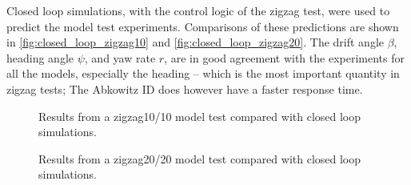 Closed loop simulations, with the control logic of the zigzag test, were used to predict the model test experiments. Comparisons of these predictions are shown in \autoref{fig:closed_loop_zigzag10} and \autoref{fig:closed_loop_zigzag20}. The drift angle $\beta$, heading angle $\psi$, and yaw rate $r$, are in good agreement with the experiments for all the models, especially the heading -- which is the most important quantity in zigzag tests; The Abkowitz ID does however have a faster response time.
\begin{figure}[h]
    \centering
    
    \caption{Results from a zigzag10/10 model test compared with closed loop simulations.}
    \label{fig:closed_loop_zigzag10}
\end{figure}
\begin{figure}[h]
    \centering
    
    \caption{Results from a zigzag20/20 model test compared with closed loop simulations.}
    \label{fig:closed_loop_zigzag20}
\end{figure}

